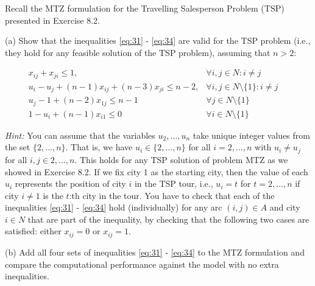 Recall the MTZ formulation for the Travelling Salesperson Problem (TSP) presented in Exercise 8.2. 

(a) Show that the inequalities \eqref{eq:31} - \eqref{eq:34} are valid for the TSP problem (i.e., they hold for any feasible solution of the TSP problem), assuming that $n > 2$:

\begin{align}
&x_{ij} + x_{ji} \leq 1, &\forall i,j \in N : i\neq j\qquad\label{eq:31}\\[5pt]
&u_i - u_j + (n-1)x_{ij} + (n-3)x_{ji} \leq n-2,   &\forall i,j \in N\setminus\{1\} : i \neq j\qquad\label{eq:32}\\[5pt]
&u_j - 1 + (n-2)x_{1j} \leq n - 1 &\forall j \in N\setminus\{1\}\qquad\\[5pt]
&1 - u_i + (n-1)x_{i1} \leq 0 &\forall i \in N\setminus\{1\}\qquad\label{eq:34}
\end{align}

\emph{Hint:} You can assume that the variables $u_2,\dots,u_n$ take unique integer values from the set $\{2,\dots,n\}$. That is, we have $u_i\in \{2,\dots,n\}$ for all $i = 2,\dots,n$ with $u_i \neq u_j$ for all $i,j\in 2,\dots,n$. This holds for any TSP solution of problem MTZ as we showed in Exercise 8.2. If we fix city 1 as the starting city, then the value of each $u_i$ represents the position of city $i$ in the TSP tour, i.e., $u_i = t$ for $t = 2,\dots,n$ if city $i\neq1$ is the $t$:th city in the tour. You have to check that each of the inequalities \eqref{eq:31} - \eqref{eq:34} hold (individually) for any arc $(i,j)\in A$ and city $i\in N$ that are part of the inequality, by checking that the following two cases are satisfied: either $x_{ij} = 0$ or $x_{ij} = 1$.


(b) Add all four sets of inequalities \eqref{eq:31} - \eqref{eq:34} to the MTZ formulation and compare the computational performance against the model with no extra inequalities.
